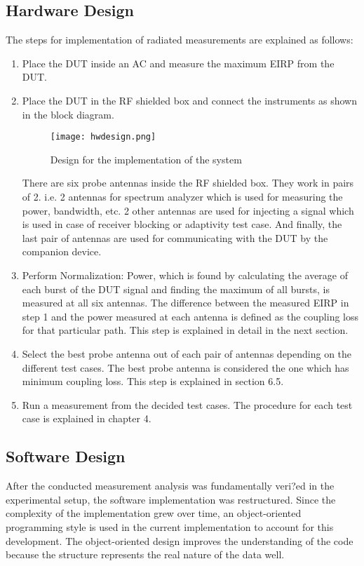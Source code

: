 \subsection{Hardware Design}
The steps for implementation of radiated measurements are explained as follows:
\begin{enumerate}
  \item Place the \acs{DUT} inside an \acf{AC} and measure the maximum \acs{EIRP} from the \acs{DUT}.
  \item Place the \acs{DUT} in the \acs{RF} shielded box and connect the instruments as shown in the block diagram.

\begin{figure}[H]
\centering
\texttt{[image: hwdesign.png]}
\caption{Design for the implementation of the system}
\label{fig:3} 
\end{figure}

There are six probe antennas inside the \acs{RF} shielded box. They work in pairs of 2. i.e. 2 antennas for spectrum analyzer which is used for measuring the power, bandwidth, etc. 2 other antennas are used for injecting a signal which is used in case of receiver blocking or adaptivity test case. And finally, the last pair of antennas are used for communicating with the \acs{DUT} by the companion device.

\item Perform Normalization: Power, which is found by calculating the average of each burst of the \acs{DUT} signal and finding the maximum of all bursts, is measured at all six antennas. The difference between the measured \acs{EIRP} in step 1 and the power measured at each antenna is defined as the coupling loss for that particular path. This step is explained in detail in the next section.

\item Select the best probe antenna out of each pair of antennas depending on the different test cases. The best probe antenna is considered the one which has minimum coupling loss. This step is explained in section 6.5. 

\item Run a measurement from the decided test cases. The procedure for each test case is explained in chapter 4.

\end{enumerate}



\subsection{Software Design}
After the conducted measurement analysis was fundamentally veri?ed in the experimental setup, the software implementation was restructured. Since the complexity of the implementation grew over time, an object-oriented programming style is used in the current implementation to account for this development. The object-oriented design improves the understanding of the code because the structure represents the real nature of the data well.

